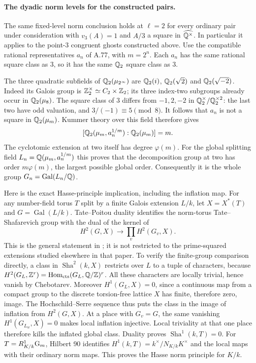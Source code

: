 \paragraph{The dyadic norm levels for the constructed pairs.}
The same fixed-level norm conclusion holds at $\ell=2$
for every ordinary pair under consideration with
$v_3(A)=1$ and $A/3$ a square in
$\widehat{\mathbb Q^\times}$.
In particular it applies to the point-$3$ congruent
ghosts constructed above.
Use the compatible rational representatives $a_n$
of A.77, with $m=2^n$.
Each $a_n$ has the same rational square class as $3$,
so it has the same $\mathbb Q_2$ square class as $3$.

The three quadratic subfields of
$\mathbb Q_2(\mu_{2^\infty})$ are
$\mathbb Q_2(i)$, $\mathbb Q_2(\sqrt2)$ and
$\mathbb Q_2(\sqrt{-2})$.
Indeed its Galois group is
$\mathbb Z_2^\times\simeq C_2\times\mathbb Z_2$; its three
index-two subgroups already occur in
$\mathbb Q_2(\mu_8)$.
The square class of $3$ differs from
$-1,2,-2$ in $\mathbb Q_2^\times/\mathbb Q_2^{\times2}$:
the last two have odd valuation, and
$3/(-1)\equiv5\pmod8$.
It follows that $a_n$ is not a square in
$\mathbb Q_2(\mu_m)$.
Kummer theory over this field therefore gives
\[
 [\mathbb Q_2(\mu_m,a_n^{1/m}):\mathbb Q_2(\mu_m)]=m .
\]
The cyclotomic extension at two itself has degree
$\varphi(m)$.
For the global splitting field
$L_n=\mathbb Q(\mu_m,a_n^{1/m})$ this proves
that the decomposition group at two has order
$m\varphi(m)$, the largest possible global order.
Consequently it is the whole group
$G_n=\operatorname{Gal}(L_n/\mathbb Q)$.

Here is the exact Hasse-principle implication, including
the inflation map.
For any number-field torus $T$ split by a finite Galois
extension $L/k$, let $X=X^*(T)$ and $G=\operatorname{Gal}(L/k)$.
Tate--Poitou duality identifies the norm-torus
Tate--Shafarevich group with the dual of the kernel of
\[
 H^2(G,X)\longrightarrow
                  \prod_v H^2(G_v,X).
\]
This is the general statement in
\cite[Proposition 6.4 and Corollary 6.5, p.~35]
{BIR_Oki2026Norm}; it is not restricted to the
prime-squared extensions studied elsewhere in that paper.
To verify the finite-group comparison directly, a class
in $\operatorname{Sha}^2(k,X)$ restricts over $L$ to a tuple of
characters, because
$H^2(G_L,\mathbb Z^r)=\operatorname{Hom}_{\rm cts}(G_L,\mathbb Q/\mathbb Z)^r$.
All these characters are locally trivial, hence vanish
by Chebotarev.
Moreover $H^1(G_L,X)=0$, since a continuous map from
a compact group to the discrete torsion-free lattice
$X$ has finite, therefore zero, image.
The Hochschild--Serre sequence thus puts the class
in the image of inflation from $H^2(G,X)$.
At a place with $G_v=G$, the same vanishing
$H^1(G_{L_w},X)=0$ makes local inflation injective.
Local triviality at that one place therefore kills
the inflated global class.
Duality proves $\operatorname{Sha}^1(k,T)=0$.
For $T=R^1_{K/k}\mathrm G_m$, Hilbert 90 identifies
$H^1(k,T)=k^\times/N_{K/k}K^\times$ and the local
maps with their ordinary norm maps.
This proves the Hasse norm principle for $K/k$.

